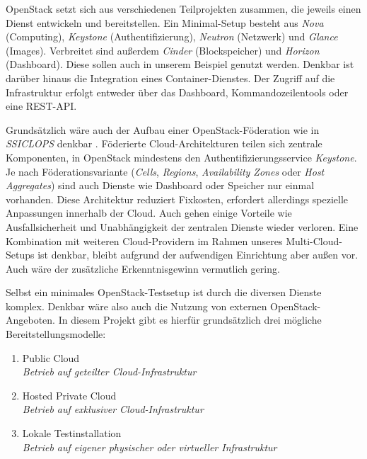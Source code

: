 OpenStack setzt sich aus verschiedenen Teilprojekten zusammen, die jeweils einen Dienst entwickeln und bereitstellen. Ein Minimal-Setup besteht aus \emph{Nova} (Computing), \emph{Key\-stone} (Authentifizierung), \emph{Neutron} (Netzwerk) und \emph{Glance} (Images). Verbreitet sind außerdem \emph{Cinder} (Blockspeicher) und \emph{Horizon} (Dash\-board). Diese sollen auch in unserem Beispiel genutzt werden. Denkbar ist darüber hinaus die Integration eines Container-Dienstes. Der Zugriff auf die Infrastruktur erfolgt entweder über das Dashboard, Kommandozeilentools oder eine REST-API.

Grundsätzlich wäre auch der Aufbau einer OpenStack-Föderation wie in \emph{SSICLOPS} denkbar \cite{ssiclops:2015:d6.1-project-presentation}. Föderierte Cloud-Architekturen teilen sich zentrale Komponenten, in OpenStack mindestens den Authentifizierungsservice \emph{Keystone}. Je nach Föderationsvariante (\emph{Cells}, \emph{Regions}, \emph{Availability Zones} oder \emph{Host Aggregates}) sind auch Dienste wie Dashboard oder Speicher nur einmal vorhanden. Diese Architektur reduziert Fixkosten, erfordert allerdings spezielle Anpassungen innerhalb der Cloud. Auch gehen einige Vorteile wie Ausfallsicherheit und Unabhängigkeit der zentralen Dienste wieder verloren. Eine Kombination mit weiteren Cloud-Providern im Rahmen unseres Multi-Cloud-Setups ist denkbar, bleibt aufgrund der aufwendigen Einrichtung aber außen vor. Auch wäre der zusätzliche Erkenntnisgewinn vermutlich gering.

Selbst ein minimales OpenStack-Testsetup ist durch die diversen Dienste komplex. Denkbar wäre also auch die Nutzung von externen OpenStack-Angeboten. In diesem Projekt gibt es hierfür grundsätzlich drei mögliche Bereitstellungsmodelle: 

\begin{enumerate}
	\item Public Cloud
	\\\emph{Betrieb auf geteilter Cloud-Infrastruktur}
	
	\item Hosted Private Cloud
	\\\emph{Betrieb auf exklusiver Cloud-Infrastruktur}
	
	\item Lokale Testinstallation
	\\\emph{Betrieb auf eigener physischer oder virtueller Infrastruktur}
\end{enumerate}


